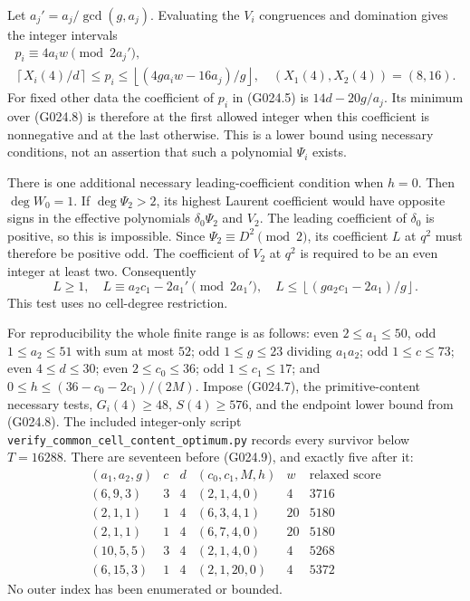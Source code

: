 Let $a_j'=a_j/\gcd(g,a_j)$. Evaluating the $V_i$
congruences and domination gives the integer intervals
\[
 \begin{gathered}
 p_i\equiv4a_iw\pmod{2a_j'},\\
 \left\lceil X_i(4)/d\right\rceil\le p_i\le
 \left\lfloor(4ga_iw-16a_j)/g\right\rfloor,
 \quad(X_1(4),X_2(4))=(8,16).
 \end{gathered}                                                       \tag{G024.8}
\]
For fixed other data the coefficient of $p_i$ in (G024.5)
is $14d-20g/a_j$. Its minimum over (G024.8) is therefore
at the first allowed integer when this coefficient is
nonnegative and at the last otherwise. This is a lower
bound using necessary conditions, not an assertion that
such a polynomial $\Psi_i$ exists.

There is one additional necessary leading-coefficient
condition when $h=0$. Then $\deg W_0=1$. If $\deg\Psi_2>2$,
its highest Laurent coefficient would have opposite signs
in the effective polynomials $\delta_0\Psi_2$ and $V_2$.
The leading coefficient of $\delta_0$ is positive, so this
is impossible. Since $\Psi_2\equiv D^2\pmod2$, its
coefficient $L$ at $q^2$ must therefore be positive odd.
The coefficient of $V_2$ at $q^2$ is required to be an
even integer at least two. Consequently
\[
 L\ge1,\quad L\equiv a_2c_1-2a_1'\pmod{2a_1'},\quad
 L\le\left\lfloor(g a_2c_1-2a_1)/g\right\rfloor.
 \tag{G024.9}
\]
This test uses no cell-degree restriction.

For reproducibility the whole finite range is as follows:
even $2\le a_1\le50$, odd $1\le a_2\le51$ with sum
at most $52$; odd $1\le g\le23$ dividing $a_1a_2$;
odd $1\le c\le73$; even $4\le d\le30$;
even $2\le c_0\le36$; odd $1\le c_1\le17$;
and $0\le h\le(36-c_0-2c_1)/(2M)$.
Impose (G024.7), the primitive-content necessary tests,
$G_i(4)\ge48$, $S(4)\ge576$, and the endpoint lower
bound from (G024.8). The included integer-only script
\texttt{verify\_common\_cell\_content\_optimum.py}
records every survivor below $T=16288$.
There are seventeen before (G024.9), and exactly five
after it:
\[
\begin{array}{c|c|c|c|c|r}
 (a_1,a_2,g)&c&d&(c_0,c_1,M,h)&w&\text{relaxed score}\\\hline
 (6,9,3)&3&4&(2,1,4,0)&4&3716\\
 (2,1,1)&1&4&(6,3,4,1)&20&5180\\
 (2,1,1)&1&4&(6,7,4,0)&20&5180\\
 (10,5,5)&3&4&(2,1,4,0)&4&5268\\
 (6,15,3)&1&4&(2,1,20,0)&4&5372
\end{array}                                                         \tag{G024.10}
\]
No outer index has been enumerated or bounded.

